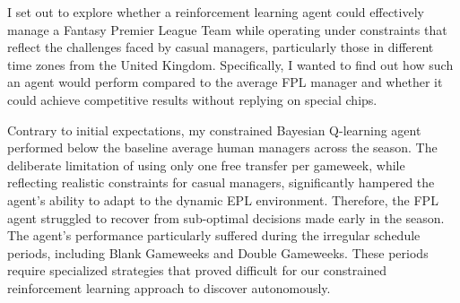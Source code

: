 I set out to explore whether a reinforcement learning agent could effectively manage a Fantasy Premier League Team while operating under constraints that reflect the challenges faced by casual managers, particularly those in different time zones from the United Kingdom. Specifically, I wanted to find out how such an agent would perform compared to the average FPL manager and whether it could achieve competitive results without replying on special chips.

Contrary to initial expectations, my constrained Bayesian Q-learning agent performed below the baseline average human managers across the season. The deliberate limitation of using only one free transfer per gameweek, while reflecting realistic constraints for casual managers, significantly hampered the agent's ability to adapt to the dynamic EPL environment. Therefore, the FPL agent struggled to recover from sub-optimal decisions made early in the season. The agent's performance particularly suffered during the irregular schedule periods, including Blank Gameweeks and Double Gameweeks. These periods require specialized strategies that proved difficult for our constrained reinforcement learning approach to discover autonomously.
